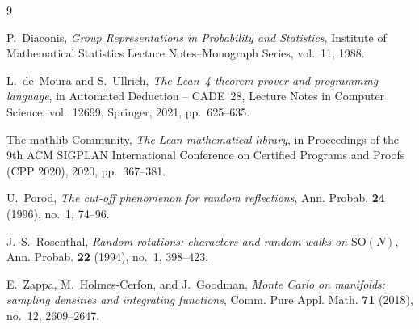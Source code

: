 \documentclass[11pt]{amsart}
\theoremstyle{definition}
\theoremstyle{remark}
\begin{document}
\begin{thebibliography}{9}

P.~Diaconis, \emph{Group Representations in Probability and Statistics}, Institute of
Mathematical Statistics Lecture Notes--Monograph Series, vol.~11, 1988.

L.~de~Moura and S.~Ullrich, \emph{The Lean~4 theorem prover and programming language}, in
Automated Deduction -- CADE~28, Lecture Notes in Computer Science, vol.~12699, Springer, 2021,
pp.~625--635.

The mathlib Community, \emph{The Lean mathematical library}, in Proceedings of the 9th ACM
SIGPLAN International Conference on Certified Programs and Proofs (CPP 2020), 2020,
pp.~367--381.

U.~Porod, \emph{The cut-off phenomenon for random reflections}, Ann. Probab. \textbf{24} (1996),
no.~1, 74--96.

J.~S.~Rosenthal, \emph{Random rotations: characters and random walks on $\mathrm{SO}(N)$}, Ann.
Probab. \textbf{22} (1994), no.~1, 398--423.

E.~Zappa, M.~Holmes-Cerfon, and J.~Goodman, \emph{Monte Carlo on manifolds: sampling densities
and integrating functions}, Comm. Pure Appl. Math. \textbf{71} (2018), no.~12, 2609--2647.

\end{thebibliography}
\end{document}
